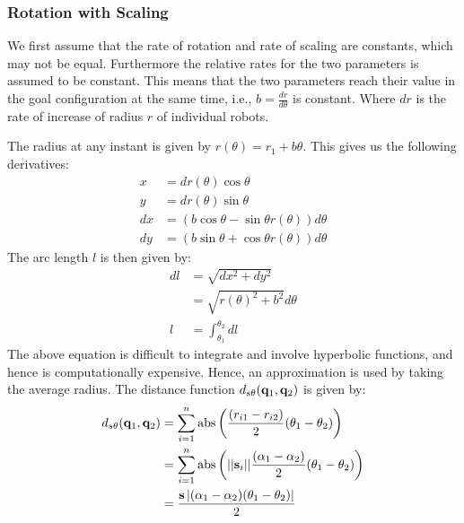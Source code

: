 \documentclass[12pt,a4paper, onecolumn]{IEEEtran}
\begin{document}
\subsubsection{Rotation with Scaling}
We first assume that the rate of rotation and rate of scaling are constants, which may not
be equal. Furthermore the relative rates for the two parameters is assumed to be constant.
This means that the two parameters reach their value in the goal configuration at the same
time, i.e., $b = \frac{dr}{d\theta}$ is constant. Where $dr$ is the rate of increase of radius
$r$ of individual robots.

The radius at any instant is given by $r(\theta) = r_1 + b \theta$. This gives us the
following derivatives:
\begin{equation}
  \begin{split}
    x &= dr(\theta)\cos\theta\\
    y &= dr(\theta)\sin\theta\\
    dx & = (b\cos\theta - \sin \theta r(\theta))d\theta\\
    dy & = (b\sin\theta + \cos \theta r(\theta))d\theta
  \end{split}
  \label{eqn:dstht}
\end{equation}
The arc length $l$ is then given by:
\begin{equation}
  \begin{split}
    dl&=\sqrt{dx^2+dy^2}\\
    &=\sqrt{r(\theta)^2 + b^2}d\theta\\
    l&= \int_{\theta_1}^{\theta_2} dl
  \end{split}
  \label{eqn:arc}
\end{equation}
The above equation is difficult to integrate and involve hyperbolic functions, and hence
is computationally expensive. Hence, an approximation is used by taking the average
radius. The distance function $d_{s\theta}(\mathbf{q}_1, \mathbf{q}_2)$ is given by:
\begin{equation}
  \begin{split}
    d_{s\theta}(\mathbf{q}_1, \mathbf{q}_2) &= \sum_{i=1}^n\operatorname{abs} \left(\frac{(r_{i1} -
      r_{i2})}{2}(\theta_1 -
    \theta_2)\right ) \\
    &=\sum_{i=1}^n \operatorname{abs}\left( ||\mathbf{s}_i|| \frac{(\alpha_1
    -\alpha_2)}{2}(\theta_1-\theta_2) \right)\\
    &=\frac{\mathbf{s} \left|  (\alpha_1 -\alpha_2)(\theta_1-\theta_2) \right|}{2}
  \end{split}
  \label{eqn:dsthta}
\end{equation}
\end{document}

